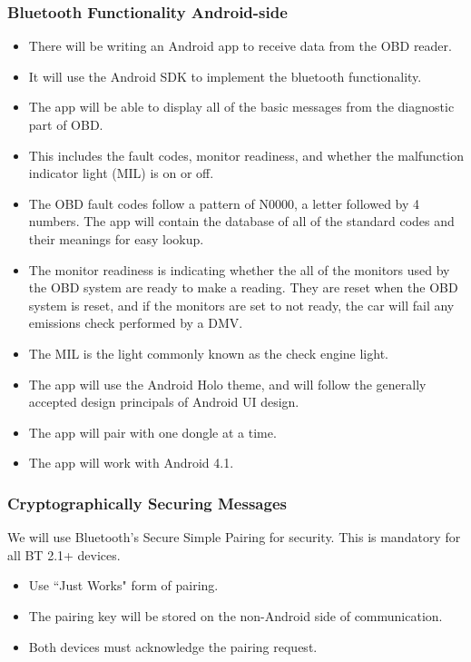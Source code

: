 \documentclass[12pt,letterpaper]{article}
\begin{document}
\subsubsection{Bluetooth Functionality Android-side}
\begin{itemize}
	\item There will be writing an Android app to receive data from the OBD reader.
	\item It will use the Android SDK to implement the bluetooth functionality.
	\item The app will be able to display all of the basic messages from the diagnostic part of OBD.
	\item This includes the fault codes, monitor readiness, and whether the malfunction indicator light (MIL) is on or off.
	\item The OBD fault codes follow a pattern of N0000, a letter followed by 4 numbers. The app will contain the database of all of the standard codes and their meanings for easy lookup. 
	\item  The monitor readiness is indicating whether the all of the monitors used by the OBD system are ready to make a reading. They are reset when the OBD system is reset, and if the monitors are set to not ready, the car will fail any emissions check performed by a DMV. 
	\item The MIL is the light commonly known as the check engine light. 
	\item The app will use the Android Holo theme, and will follow the generally accepted design principals of Android UI design.
	\item The app will pair with one dongle at a time.
	\item The app will work with Android 4.1.

\end{itemize}

\subsubsection{Cryptographically Securing Messages}
We will use Bluetooth's Secure Simple Pairing for security. This is mandatory for all BT 2.1+ devices.

\begin{itemize}
	\item Use ``Just Works" form of pairing.
	\item The pairing key will be stored on the non-Android side of communication.
	\item Both devices must acknowledge the pairing request.
\end{itemize}
\end{document}
